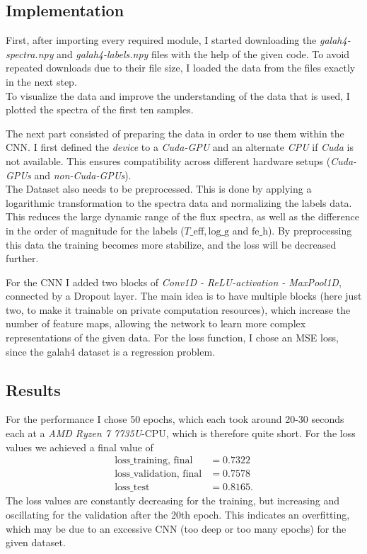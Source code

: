 

\setlength{\parindent}{0em}



\subsection{Implementation}
First, after importing every required module, I started downloading the \textit{galah4-spectra.npy} and \textit{galah4-labels.npy} files with the help of the given code.
To avoid repeated downloads due to their file size, I loaded the data from the files exactly in the next step.\\
To visualize the data and improve the understanding of the data that is used, I plotted the spectra of the first ten samples. 

The next part consisted of preparing the data in order to use them within the CNN. I first defined the \textit{device} to a \textit{Cuda-GPU} and an alternate \textit{CPU} if \textit{Cuda} is not available.
This ensures compatibility across different hardware setups (\textit{Cuda-GPUs} and \textit{non-Cuda-GPUs}).\\
The Dataset also needs to be preprocessed. This is done by applying a logarithmic transformation to the spectra data and normalizing the labels data.
This reduces the large dynamic range of the flux spectra, as well as the difference in the order of magnitude for the labels ($T\_\text{eff}, \text{log\_g}$ and $\text{fe\_h}$).
By preprocessing this data the training becomes more stabilize, and the loss will be decreased further.

For the CNN I added two blocks of \textit{Conv1D - ReLU-activation - MaxPool1D}, connected by a Dropout layer.
The main idea is to have multiple blocks (here just two, to make it trainable on private computation resources), which increase the number of feature maps, allowing the network to learn more complex representations of the given data.
For the loss function, I chose an MSE loss, since the galah4 dataset is a regression problem.

\subsection{Results}
For the performance I chose 50 epochs, which each took around 20-30 seconds each at a \textit{AMD Ryzen 7 7735U}-CPU, which is therefore quite short.
For the loss values we achieved a final value of
\begin{align*}
  \text{loss\_training, final} &= 0.7322\\
  \text{loss\_validation, final} &= 0.7578\\
  \text{loss\_test} &= 0.8165.
\end{align*}
The loss values are constantly decreasing for the training, but increasing and oscillating for the validation after the 20th epoch.
This indicates an overfitting, which may be due to an excessive CNN (too deep or too many epochs) for the given dataset.

